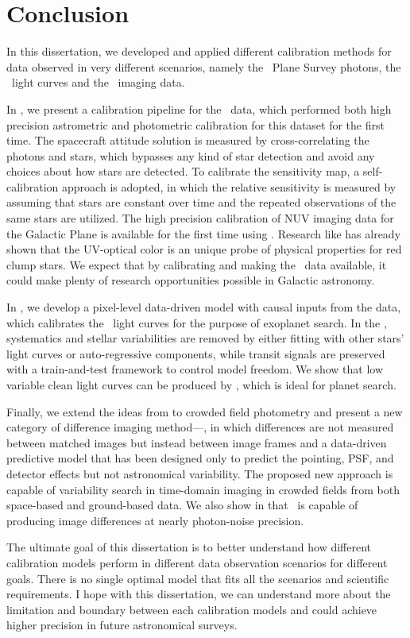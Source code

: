 \chapter*{Conclusion}

In this dissertation, we developed and applied different calibration methods for data observed in very different scenarios, namely the \galex\ Plane Survey photons, the \kepler\ light curves and the \KTCN\ imaging data.

In , we present a calibration pipeline for the \cause\ data, which performed both high precision astrometric and photometric calibration for this dataset for the first time.
The spacecraft attitude solution is measured by cross-correlating the photons and stars, which bypasses any kind of star detection and avoid any choices about how stars are detected.
To calibrate the sensitivity map, a self-calibration approach is adopted, in which the relative sensitivity is measured by assuming that stars are constant over time and the repeated observations of the same stars are utilized.
The high precision calibration of NUV imaging data for the Galactic Plane is available for the first time using \galex. 
Research like \cite{redclump} has already shown that the UV-optical color is an unique probe of physical properties for red clump stars.
We expect that by calibrating and making the \cause\ data available, it could make plenty of research opportunities possible in Galactic astronomy.

In , we develop a pixel-level data-driven model with causal inputs from the data, which calibrates the \kepler\ light curves for the purpose of exoplanet search.
In the \cpm, systematics and stellar variabilities are removed by either fitting with other stars' light curves or auto-regressive components, while transit signals are preserved with a train-and-test framework to control model freedom.
We show that low variable clean light curves can be produced by \cpm, which is ideal for planet search.

Finally, we extend the ideas from  to crowded field photometry and present a new category of difference imaging method---\cpmdiff, in which differences are not measured between matched images but instead between image frames and a data-driven predictive model that has been designed only to predict the pointing, PSF, and detector effects but not astronomical variability.
The proposed new approach is capable of variability search in time-domain imaging in crowded fields from both space-based and ground-based data.
We also show in  that \cpmdiff\ is capable of producing image differences at nearly photon-noise precision. 

The ultimate goal of this dissertation is to better understand how different calibration models perform in different data observation scenarios for different goals.
There is no single optimal model that fits all the scenarios and scientific requirements.
I hope with this dissertation, we can understand more about the limitation and boundary between each calibration models and could achieve higher precision in future astronomical surveys.

